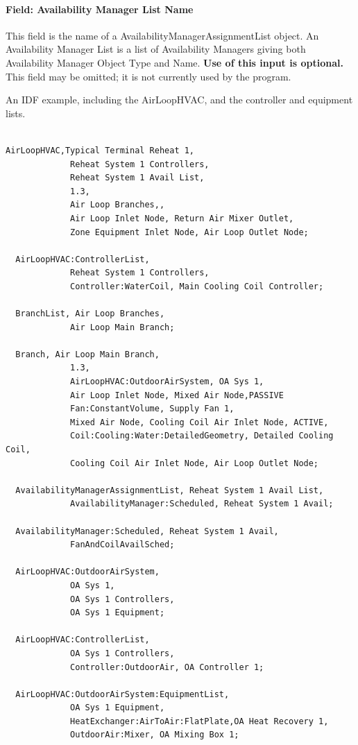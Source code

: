 \paragraph{Field: Availability Manager List Name}\label{field-availability-manager-list-name-1}

This field is the name of a AvailabilityManagerAssignmentList object. An Availability Manager List is a list of Availability Managers giving both Availability Manager Object Type and Name. \textbf{Use of this input is optional.} This field may be omitted; it is not currently used by the program.

An IDF example, including the AirLoopHVAC, and the controller and equipment lists.

\begin{lstlisting}

AirLoopHVAC,Typical Terminal Reheat 1,
             Reheat System 1 Controllers,
             Reheat System 1 Avail List,
             1.3,
             Air Loop Branches,,
             Air Loop Inlet Node, Return Air Mixer Outlet,
             Zone Equipment Inlet Node, Air Loop Outlet Node;

  AirLoopHVAC:ControllerList,
             Reheat System 1 Controllers,
             Controller:WaterCoil, Main Cooling Coil Controller;

  BranchList, Air Loop Branches,
             Air Loop Main Branch;

  Branch, Air Loop Main Branch,
             1.3,
             AirLoopHVAC:OutdoorAirSystem, OA Sys 1,
             Air Loop Inlet Node, Mixed Air Node,PASSIVE
             Fan:ConstantVolume, Supply Fan 1,
             Mixed Air Node, Cooling Coil Air Inlet Node, ACTIVE,
             Coil:Cooling:Water:DetailedGeometry, Detailed Cooling Coil,
             Cooling Coil Air Inlet Node, Air Loop Outlet Node;

  AvailabilityManagerAssignmentList, Reheat System 1 Avail List,
             AvailabilityManager:Scheduled, Reheat System 1 Avail;

  AvailabilityManager:Scheduled, Reheat System 1 Avail,
             FanAndCoilAvailSched;

  AirLoopHVAC:OutdoorAirSystem,
             OA Sys 1,
             OA Sys 1 Controllers,
             OA Sys 1 Equipment;

  AirLoopHVAC:ControllerList,
             OA Sys 1 Controllers,
             Controller:OutdoorAir, OA Controller 1;

  AirLoopHVAC:OutdoorAirSystem:EquipmentList,
             OA Sys 1 Equipment,
             HeatExchanger:AirToAir:FlatPlate,OA Heat Recovery 1,
             OutdoorAir:Mixer, OA Mixing Box 1;
\end{lstlisting}

